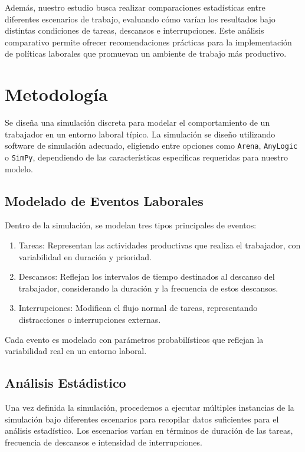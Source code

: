 \documentclass[10pt,a4paper,twocolumn]{article}
\begin{document}
Además, nuestro estudio busca realizar comparaciones estadísticas entre diferentes escenarios de trabajo, evaluando cómo varían los resultados bajo distintas condiciones de tareas, descansos e interrupciones. Este análisis comparativo permite ofrecer recomendaciones prácticas para la implementación de políticas laborales que promuevan un ambiente de trabajo más productivo.

\section{Metodología} 
Se dise\~na una simulación discreta para modelar el comportamiento de un trabajador en un entorno laboral típico. La simulación se diseño utilizando software de simulación adecuado, eligiendo entre opciones como \texttt{Arena}, \texttt{AnyLogic} o \texttt{SimPy}, dependiendo de las características específicas requeridas para nuestro modelo.

\subsection{Modelado de Eventos Laborales}
Dentro de la simulación, se modelan tres tipos principales de eventos:

\begin{enumerate}
    \item Tareas: Representan las actividades productivas que realiza el trabajador, con variabilidad en duración y prioridad.
    \item Descansos: Reflejan los intervalos de tiempo destinados al descanso del trabajador, considerando la duración y la frecuencia de estos descansos. 
    \item Interrupciones: Modifican el flujo normal de tareas, representando distracciones o interrupciones externas.
\end{enumerate}

Cada evento es modelado con parámetros probabilísticos que reflejan la variabilidad real en un entorno laboral.

\subsection{An\'alisis Est\'adistico}

Una vez definida la simulación, procedemos a ejecutar múltiples instancias de la simulación bajo diferentes escenarios para recopilar datos suficientes para el análisis estadístico. Los escenarios var\'ian en términos de duración de las tareas, frecuencia de descansos e intensidad de interrupciones.
\end{document}

